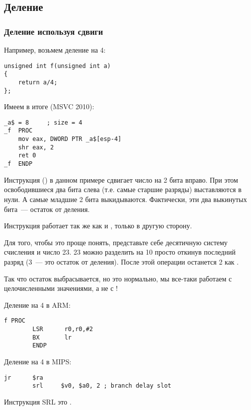 \subsection{Деление}

\subsubsection{Деление используя сдвиги}
\label{division_by_shifting}

Например, возьмем деление на 4:

\begin{lstlisting}[style=customc]
unsigned int f(unsigned int a)
{
	return a/4;
};
\end{lstlisting}

Имеем в итоге (MSVC 2010):

\begin{lstlisting}[caption=MSVC 2010,style=customasmx86]
_a$ = 8		; size = 4
_f	PROC
	mov	eax, DWORD PTR _a$[esp-4]
	shr	eax, 2
	ret	0
_f	ENDP
\end{lstlisting}

\label{SHR}
Инструкция \SHR () в данном примере сдвигает число на 2 бита вправо. 
При этом освободившиеся два бита слева (т.е. самые 
старшие разряды) выставляются в нули. А самые младшие 2 бита выкидываются. 
Фактически, эти два выкинутых бита~--- остаток от деления.

Инструкция \SHR работает так же как и \SHL, только в другую сторону.



Для того, чтобы это проще понять, представьте себе десятичную систему счисления и число 23. 
23 можно разделить на 10 просто откинув последний разряд (3~--- это остаток от деления). 
После этой операции останется 2 как .

Так что остаток выбрасывается, но это нормально, мы все-таки работаем с целочисленными
значениями, а не с !

Деление на 4 в ARM:

\begin{lstlisting}[caption=\NonOptimizingKeilVI (\ARMMode),style=customasmARM]
f PROC
        LSR      r0,r0,#2
        BX       lr
        ENDP
\end{lstlisting}

Деление на 4 в MIPS:

\begin{lstlisting}[caption=\Optimizing GCC 4.4.5 (IDA),style=customasmMIPS]
        jr      $ra
        srl     $v0, $a0, 2 ; branch delay slot
\end{lstlisting}

Инструкция SRL это .
